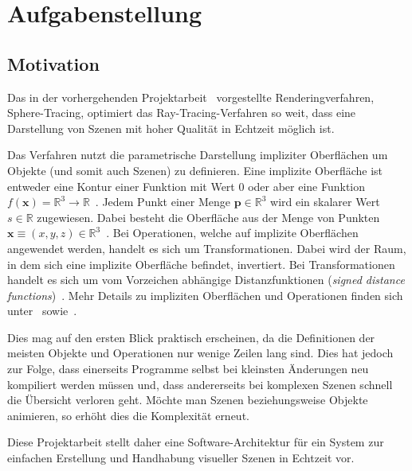 
\chapter{Aufgabenstellung}
\label{chap:scope}

\section{Motivation}
\label{sec:motivation}

Das in der vorhergehenden Projektarbeit~\cite{osterwalder_sven_volume_2016}
vorgestellte Renderingverfahren, Sphere-Tracing, optimiert das
Ray-Tracing-Verfahren so weit, dass eine Darstellung von Szenen mit hoher
Qualität in Echtzeit möglich ist.

Das Verfahren nutzt die parametrische Darstellung impliziter Oberflächen  um
Objekte (und somit auch Szenen) zu definieren. Eine implizite Oberfläche ist
entweder eine Kontur einer Funktion mit Wert 0 oder aber eine Funktion
$f(\bm{x}) = \mathbb{R}^{3} \to \mathbb{R}$~\cite[S.
29]{osterwalder_sven_volume_2016}. Jedem
Punkt einer Menge $ \bm{p} \in \mathbb{R}^{3} $ wird ein skalarer
Wert $ s \in \mathbb{R} $ zugewiesen. Dabei besteht die Oberfläche aus
der Menge von Punkten $ \bm{x} \equiv (x, y, z) \in \mathbb{R}^{3}
$~\cite[S. 29]{osterwalder_sven_volume_2016}. Bei Operationen, welche auf
implizite Oberflächen angewendet werden, handelt es sich um Transformationen.
Dabei wird der Raum, in dem sich eine implizite Oberfläche befindet,
invertiert. Bei Transformationen handelt es sich um vom Vorzeichen abhängige
Distanzfunktionen (\textit{signed distance functions})~\cite[S.
37]{osterwalder_sven_volume_2016}. Mehr Details zu impliziten Oberflächen und
Operationen finden sich unter~\cite[S. 29ff]{osterwalder_sven_volume_2016}
sowie~\cite[S. 37ff]{osterwalder_sven_volume_2016}.

Dies mag auf den ersten Blick praktisch erscheinen, da die
Definitionen der meisten Objekte und Operationen nur wenige Zeilen lang sind.
Dies hat jedoch zur Folge, dass einerseits Programme selbst bei kleinsten
Änderungen neu kompiliert werden müssen und, dass andererseits bei komplexen
Szenen schnell die Übersicht verloren geht. Möchte man Szenen beziehungsweise
Objekte animieren, so erhöht dies die Komplexität erneut.

Diese Projektarbeit stellt daher eine Software-Architektur für ein System zur
einfachen Erstellung und Handhabung visueller Szenen in Echtzeit vor.

